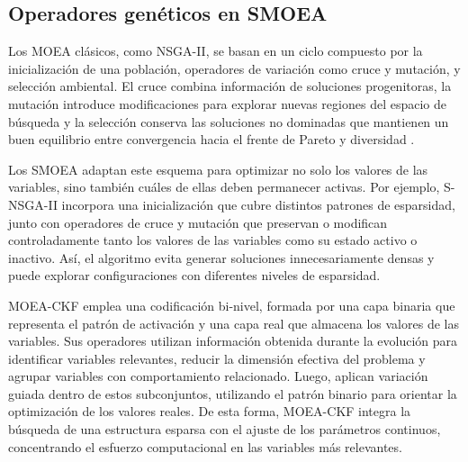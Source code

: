 \subsection{Operadores genéticos en SMOEA}\label{subsec:operadores_geneticos}
Los MOEA clásicos, como NSGA-II, se basan en un ciclo compuesto por la inicialización de una población, operadores de variación como cruce y mutación, y selección ambiental. El cruce combina información de soluciones progenitoras, la mutación introduce modificaciones para explorar nuevas regiones del espacio de búsqueda y la selección conserva las soluciones no dominadas que mantienen un buen equilibrio entre convergencia hacia el frente de Pareto y diversidad \cite{Deb2002NSGAII}.

Los SMOEA adaptan este esquema para optimizar no solo los valores de las variables, sino también cuáles de ellas deben permanecer activas. Por ejemplo, S-NSGA-II incorpora una inicialización que cubre distintos patrones de esparsidad, junto con operadores de cruce y mutación que preservan o modifican controladamente tanto los valores de las variables como su estado activo o inactivo. Así, el algoritmo evita generar soluciones innecesariamente densas y puede explorar configuraciones con diferentes niveles de esparsidad.

MOEA-CKF emplea una codificación bi-nivel, formada por una capa binaria que representa el patrón de activación y una capa real que almacena los valores de las variables. Sus operadores utilizan información obtenida durante la evolución para identificar variables relevantes, reducir la dimensión efectiva del problema y agrupar variables con comportamiento relacionado. Luego, aplican variación guiada dentro de estos subconjuntos, utilizando el patrón binario para orientar la optimización de los valores reales. De esta forma, MOEA-CKF integra la búsqueda de una estructura esparsa con el ajuste de los parámetros continuos, concentrando el esfuerzo computacional en las variables más relevantes.





